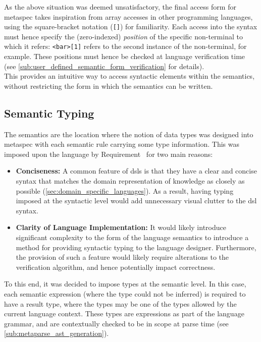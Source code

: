 As the above situation was deemed unsatisfactory, the final access form for \gls{metaspec} takes inspiration from array accesses in other programming languages, using the square-bracket notation (\texttt{[]}) for familiarity.
Each access into the syntax must hence specify the (zero-indexed) \textit{position} of the specific non-terminal to which it refers: \texttt{<bar>[1]} refers to the second instance of the non-terminal, for example.
These positions must hence be checked at language verification time (see \autoref{sub:user_defined_semantic_form_verification} for details).\\

This provides an intuitive way to access syntactic elements within the semantics, without restricting the form in which the semantics can be written. 


\subsection{Semantic Typing} %
\label{sub:semantic_typing}
The semantics are the location where the notion of data types was designed into \gls{metaspec} with each semantic rule carrying some type information. 
This was imposed upon the language by Requirement~ for two main reasons:
\begin{itemize}
    \item \textbf{Conciseness:} A common feature of \glspl{dsl} is that they have a clear and concise syntax that matches the domain representation of knowledge as closely as possible (\autoref{sec:domain_specific_languages}). 
    As a result, having typing imposed at the syntactic level would add unnecessary visual clutter to the \gls{dsl} syntax. 
    \item \textbf{Clarity of Language Implementation:} It would likely introduce significant complexity to the form of the language semantics to introduce a method for providing syntactic typing to the language designer.
    Furthermore, the provision of such a feature would likely require alterations to the verification algorithm, and hence potentially impact correctness. 
\end{itemize}

To this end, it was decided to impose types at the semantic level.
In this case, each semantic expression (where the type could not be inferred) is required to have a result type, where the types may be one of the types allowed by the current language context. 
These types are expressions as part of the language grammar, and are contextually checked to be in scope at parse time (see \autoref{sub:metaparse_ast_generation}).\\

